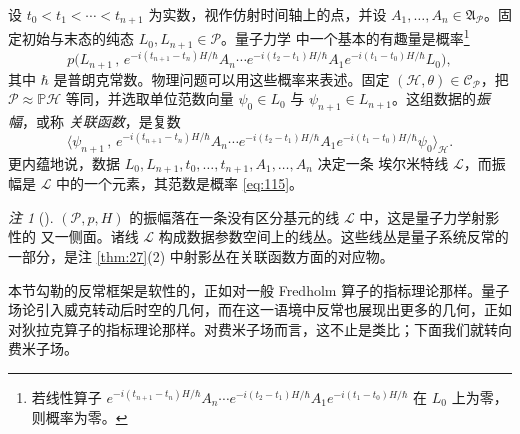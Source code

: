 \documentclass[11pt]{amsart}
\theoremstyle{definition}
\theoremstyle{remark}
\newtheorem{remark}[equation]{注}
\theoremstyle{plain}
\numberwithin{equation}{section}
\renewcommand{\:}{\colon}
\newcommand{\PP}{{\mathbb P}}
\newcommand{\AP}{\ssA_{\sP}}
\newcommand{\PH}{\PP\sH}
\newcommand{\cP}{\sC_{\sP}}
\newcommand{\evo}[2]{e^{-i(t_{#1}-t_{#2})H/\hbar}}
\newcommand{\sC}{\mathscr{C}}
\newcommand{\sH}{\mathscr{H}}
\newcommand{\sL}{\mathcal{L}}
\newcommand{\sP}{\mathscr{P}}
\newcommand{\ssA}{\mathfrak{A}}
\begin{document}

设 $t_0<t_1<\cdots< t_{n+1}$ 为实数，视作仿射时间轴上的点，并设
$A_1,\dots ,A_n\in \AP$。固定初始与末态的纯态 $L_0,L_{n+1}\in \sP$。量子力学
中一个基本的有趣量是概率\footnote{若线性算子
$\evo{n+1}n A_n\cdots\evo21 A_1\evo10$ 在 $L_0$ 上为零，则概率为零。}
  \begin{equation}\label{eq:115}
     p\bigl(L_{n+1}\,,\, \evo{n+1}n A_n\cdots\evo21 A_1\evo10 L_0 \bigr),
  \end{equation}
其中 $\hbar$ 是普朗克常数。物理问题可以用这些概率来表述。固定
$(\sH,\theta )\in \cP$，把 $\sP\approx \PH$ 等同，并选取单位范数向量
$\psi _0\in L_0$ 与 $\psi _{n+1}\in L_{n+1}$。这组数据的\emph{振幅}，或称
\emph{关联函数}，是复数
  \begin{equation}\label{eq:116}
     \bigl\langle \psi _{n+1}\,,\, \evo{n+1}n A_n\cdots\evo21 A_1\evo10 \psi _0
     \bigr\rangle_{\sH} .
  \end{equation}
更内蕴地说，数据 $L_0,L_{n+1},t_0,\dots ,t_{n+1},A_1,\dots ,A_n$ 决定一条
埃尔米特线 $\sL$，而振幅是 $\sL$ 中的一个元素，其范数是概率 \eqref{eq:115}。


   \begin{remark}[]\label{thm:28}
  $(\sP,p,H)$ 的振幅落在一条没有区分基元的线 $\sL$ 中，这是量子力学射影性的
 又一侧面。诸线 $\sL$ 构成数据参数空间上的线丛。这些线丛是量子系统反常的
 一部分，是注 \ref{thm:27}(2) 中射影丛在关联函数方面的对应物。
   \end{remark}


本节勾勒的反常框架是软性的，正如对一般 Fredholm 算子的指标理论那样。量子
场论引入威克转动后时空的几何，而在这一语境中反常也展现出更多的几何，正如
对狄拉克算子的指标理论那样。对费米子场而言，这不止是类比；下面我们就转向
费米子场。
\end{document}
